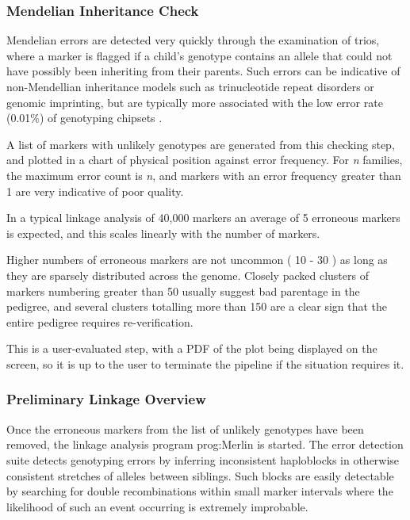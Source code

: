 \subsubsection{Mendelian Inheritance Check}

Mendelian errors are detected very quickly through the examination of trios, where a marker is flagged if a child's genotype contains an allele that could not have possibly been inheriting from their parents.  Such errors can be indicative of non-Mendellian inheritance models such as trinucleotide repeat disorders or genomic imprinting\citep{Walker2007218}, but are typically more associated with the low error rate (0.01\%) of genotyping chipsets \citep{saunders_estimating_2007}.

A list of markers with unlikely genotypes are generated from this checking step, and plotted in a chart of physical position against error frequency. For \textit{n} families, the maximum error count is \textit{n}, and markers with an error frequency greater than 1 are very indicative of poor quality.

In a typical linkage analysis of 40,000 markers an average of 5 erroneous markers is expected, and this scales linearly with the number of markers.

Higher numbers of erroneous markers are not uncommon ( 10 - 30 ) as long as they are sparsely distributed across the genome. Closely packed clusters of markers numbering greater than 50 usually suggest bad parentage in the pedigree, and several clusters totalling more than 150 are a clear sign that the entire pedigree requires re-verification.

This is a user-evaluated step, with a PDF of the plot being displayed on the screen, so it is up to the user to terminate the pipeline if the situation requires it.


\subsubsection{Preliminary Linkage Overview}

Once the erroneous markers from the list of unlikely genotypes have been removed, the linkage analysis program \gls{prog:Merlin} is started. The error detection  suite detects genotyping errors by inferring inconsistent haploblocks in otherwise consistent stretches of alleles between siblings\citep{merlin}. Such blocks are easily detectable by searching for double recombinations within small marker intervals where the likelihood of such an event occurring is extremely improbable.

